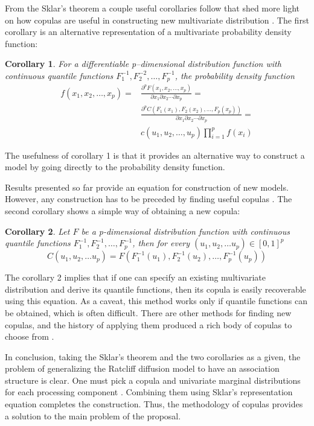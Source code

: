 \documentclass[12pt]{article}
\begin{document}
	From the Sklar’s theorem a couple useful corollaries follow that shed more light on how copulas are useful in constructing new multivariate distribution \citep{Joe1997,Nel2007}. The first corollary is an alternative representation of a multivariate probability density function: 
\newtheorem{cors}{Corollary}
\begin{cors}
For a differentiable p--dimensional distribution function with continuous quantile functions $F_1^{-1}, F_2^{-2}, \dots, F_p^{-1}$, the probability density function
\begin{align*}
f(x_1,x_2, \dots, x_p) = & \frac{\partial^p F(x_1, x_2, \dots, x_p)}{\partial x_1 \partial x_2 \cdots \partial x_p} = \\ 
& \frac{\partial^p C(F_1(x_1), F_2(x_2), \dots, F_p(x_p))}{\partial x_1 \partial x_2 \cdots \partial x_p} = \nonumber \\
& c(u_1, u_2, \dots, u_p)\prod_{i = 1}^p f(x_i)
\end{align*}
\end{cors} 
The usefulness of corollary 1 is that it provides an alternative way to construct a model by going directly to the probability density function.

	 Results presented so far provide an equation for construction of new models. However, any construction has to be preceded by finding useful copulas \citep{Joe1997,Nel2007}. The second corollary shows a simple way of obtaining a new copula:
\begin{cors}
Let $F$ be a p-dimensional distribution function with continuous quantile functions $F_1^{-1}, F_2^{-1}, \dots, F_p^{-1}$, then for every $(u_1, u_2, \dots u_p) \in [0, 1]^p$ 
\begin{equation*}
C(u_1, u_2, \dots u_p) = F(F_1^{-1}(u_1), F_2^{-1}(u_2), \dots, F_p^{-1}(u_p))
\end{equation*}
\end{cors}
The corollary 2 implies that if one can specify an existing multivariate distribution and derive its quantile functions, then its copula is easily recoverable using this equation. As a caveat, this method works only if quantile functions can be obtained, which is often difficult. There are other methods for finding new copulas, and the history of applying them produced a rich body of copulas to choose from \citep{Joe1997,Nel2007}. 

	In conclusion, taking the Sklar’s theorem and the two corollaries as a given, the problem of generalizing the Ratcliff diffusion model to have an association structure is clear. One must pick a copula and univariate marginal distributions for each processing component \citep{JohKot1994,JohKot1995}. Combining them using Sklar’s representation equation completes the construction. Thus, the methodology of copulas provides a solution to the main problem of the proposal.
\end{document}
